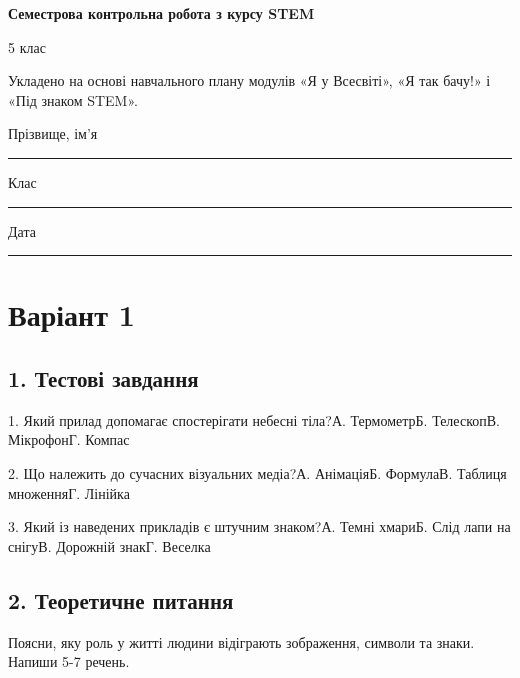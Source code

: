 \documentclass[11pt,a4paper]{article}
\begin{document}
\begin{center}\Large\textbf{Семестрова контрольна робота з курсу STEM}\end{center}

5 клас\par

Укладено на основі навчального плану модулів «Я у Всесвіті», «Я так бачу!» і «Під знаком STEM».\par

Прізвище, ім'я \rule{0.65\linewidth}{0.4pt}\par

Клас \rule{0.25\linewidth}{0.4pt}    Дата \rule{0.25\linewidth}{0.4pt}\par

\section*{Варіант 1}

\subsection*{1. Тестові завдання}

1. Який прилад допомагає спостерігати небесні тіла?\newline А. Термометр\newline Б. Телескоп\newline В. Мікрофон\newline Г. Компас\par

2. Що належить до сучасних візуальних медіа?\newline А. Анімація\newline Б. Формула\newline В. Таблиця множення\newline Г. Лінійка\par

3. Який із наведених прикладів є штучним знаком?\newline А. Темні хмари\newline Б. Слід лапи на снігу\newline В. Дорожній знак\newline Г. Веселка\par

\subsection*{2. Теоретичне питання}

Поясни, яку роль у житті людини відіграють зображення, символи та знаки. Напиши 5-7 речень.\par
\end{document}
